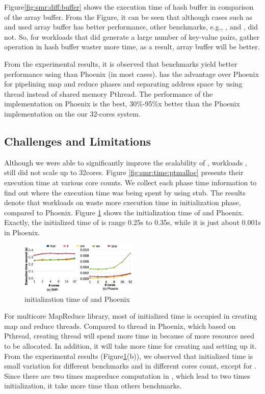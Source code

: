 Figure\ref{fig:smr:diff:buffer} shows the execution time of hash buffer in comparison of the array buffer. 
From the Figure, it can be seen that although cases such as  and  used array buffer has better performance, other benchmarks, e.g., ,  and , did not.
So, for workloads that did generate a large number of key-value pairs, gather operation in hash buffer waster more time, as a result, array buffer will be better.

From the experimental results, it is observed that benchmarks yield better performance using \myds than Phoenix (in most cases). 
\myds has the advantage over Phoenix for pipelining map and reduce phases and separating address space by using \myth thread instead of shared memory Pthread. 
The performance of the  implementation on Phoenix is the best, 30\%-95\%x better than the Phoenix implementation on the our 32-cores system.

\subsection{ Challenges and Limitations}	
Although we were able to significantly improve the scalability of \myds, 
workloads ,  still did not scale up to 32cores.
Figure \ref{fig:smr:time:ptmalloc} presents their execution time at various core counts.
We collect each phase time information to find out where the execution time was being spent by using stub. 
The results denote that workloads on \myds waste more execution time in initialization phase, compared to Phoenix.
Figure \ref{fig:env:init} shows the initialization time of \myds and Phoenix.
Exactly, the initialized time of \myds is range 0.25s to 0.35s, while it is just about 0.001s in Phoenix.
\begin{figure}[!h!t]  
	\centering
	\includegraphics[width=0.5\textwidth]{eps/env_init.eps}
	\caption{initialization time of \myds and Phoenix}
	\label{fig:env:init}
\end{figure}


For multicore MapReduce library, most of initialized time is occupied in creating map and reduce threads.
Compared to thread in Phoenix, which based on Pthread, creating thread will spend more time in \myds because of more resource need to be allocated.
In addition, it will take more time for creating  and setting up it.
From the experimental results (Figure\ref{fig:env:init}(b)), we observed that initialized time is small variation for different benchmarks and in different cores count, except for .
Since there are two times mapreduce computation in , which lead to two times initialization, it take more time than others benchmarks.
  


